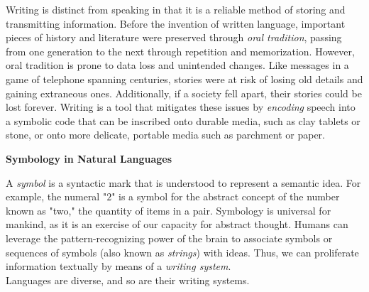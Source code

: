 Writing is distinct from speaking in that it is a reliable method of storing and transmitting information. Before the invention of written language, important pieces of history and literature were preserved through \textit{oral tradition}, passing from one generation to the next through repetition and memorization. However, oral tradition is prone to data loss and unintended changes. Like messages in a game of telephone spanning centuries, stories were at risk of losing old details and gaining extraneous ones. Additionally, if a society fell apart, their stories could be lost forever. Writing is a tool that mitigates these issues by \textit{encoding} speech into a symbolic code that can be inscribed onto durable media, such as clay tablets or stone, or onto more delicate, portable media such as parchment or paper. \\


\begin{tcolorbox}[breakable, enhanced, colback=textbook-blue, sharp corners]
	\vspace{3mm}
	\begin{center}
		\textbf{Symbology in Natural Languages}
	\end{center}
	
	A \textit{symbol} is a syntactic mark that is understood to represent a semantic idea. For example, the numeral "$2$" is a symbol for the abstract concept of the number known as "two," the quantity of items in a pair. Symbology is universal for mankind, as it is an exercise of our capacity for abstract thought. Humans can leverage the pattern-recognizing power of the brain to associate symbols or sequences of symbols (also known as \textit{strings}) with ideas. Thus, we can proliferate information textually by means of a \textit{writing system}. \\
	
	Languages are diverse, and so are their writing systems.
	\vspace{3mm}
\end{tcolorbox}
\vspace{2\baselineskip}


